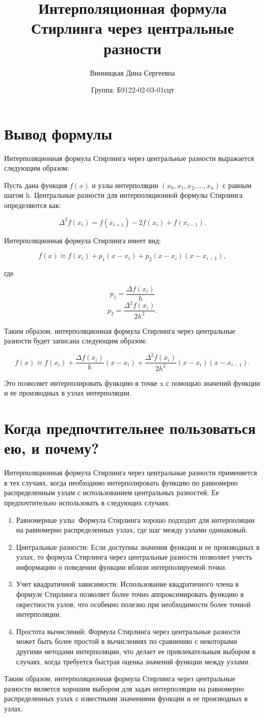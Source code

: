 \documentclass{article}
\title{\vspace{-2cm}Интерполяционная формула Стирлинга через центральные разности}
\author{Винницкая Дина Сергеевна}
\date{Группа: Б9122-02-03-01сцт}
\begin{document}
\section*{ Вывод формулы}

Интерполяционная формула Стирлинга через центральные разности выражается следующим образом:

Пусть дана функция \( f(x) \) и узлы интерполяции \( (x_0, x_1, x_2, ..., x_n) \) с равным шагом h. Центральные разности для интерполяционной формулы Стирлинга определяются как:

\[ \Delta^2 f(x_i) = f(x_{i+1}) - 2f(x_i) + f(x_{i-1}). \]

Интерполяционная формула Стирлинга имеет вид:

\[ f(x) \approx f(x_i) + p_1(x-x_i) + p_2(x-x_i)(x-x_{i-1}), \]

где

\[ p_1 = \frac{\Delta f(x_i)}{h} \]
\[ p_2 = \frac{\Delta^2 f(x_i)}{2h^2}. \]

Таким образом, интерполяционная формула Стирлинга через центральные разности будет записана следующим образом:

\[ f(x) \approx f(x_i) + \frac{\Delta f(x_i)}{h} (x-x_i) + \frac{\Delta^2 f(x_i)}{2h^2} (x-x_i)(x-x_{i-1}). \]

Это позволяет интерполировать функцию в точке x с помощью значений функции и ее производных в узлах интерполяции.

\section*{ Когда предпочтительнее пользоваться ею, и почему?}
Интерполяционная формула Стирлинга через центральные разности применяется в тех случаях, когда необходимо интерполировать функцию по равномерно распределенным узлам с использованием центральных разностей. Ее предпочтительно использовать в следующих случаях:

\begin{enumerate}
    \item Равномерные узлы: Формула Стирлинга хорошо подходит для интерполяции на равномерно распределенных узлах, где шаг между узлами одинаковый.
    \item Центральные разности: Если доступны значения функции и ее производных в узлах, то формула Стирлинга через центральные разности позволяет учесть информацию о поведении функции вблизи интерполируемой точки.

    \item Учет квадратичной зависимости: Использование квадратичного члена в формуле Стирлинга позволяет более точно аппроксимировать функцию в окрестности узлов, что особенно полезно при необходимости более точной интерполяции.
    \item Простота вычислений: Формула Стирлинга через центральные разности может быть более простой в вычислениях по сравнению с некоторыми другими методами интерполяции, что делает ее привлекательным выбором в случаях, когда требуется быстрая оценка значений функции между узлами.
    
\end{enumerate}

Таким образом, интерполяционная формула Стирлинга через центральные разности является хорошим выбором для задач интерполяции на равномерно распределенных узлах с известными значениями функции и ее производных в узлах.
\end{document}
